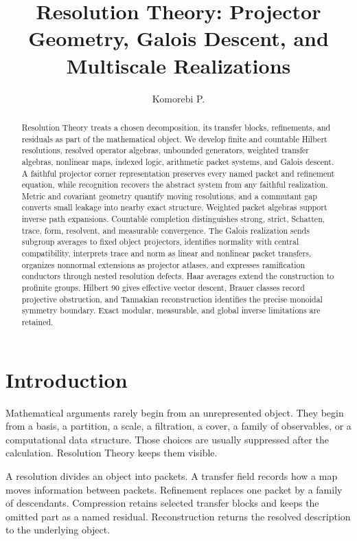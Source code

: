 \documentclass{aomart}
\title[Resolution Theory]{Resolution Theory: Projector Geometry, Galois Descent, and Multiscale Realizations}
\author[Komorebi P.]{Komorebi P.}
\theoremstyle{definition}
\theoremstyle{remark}
\begin{document}
\begin{abstract}
Resolution Theory treats a chosen decomposition, its transfer blocks, refinements, and residuals as part of the mathematical object. We develop finite and countable Hilbert resolutions, resolved operator algebras, unbounded generators, weighted transfer algebras, nonlinear maps, indexed logic, arithmetic packet systems, and Galois descent. A faithful projector corner representation preserves every named packet and refinement equation, while recognition recovers the abstract system from any faithful realization. Metric and covariant geometry quantify moving resolutions, and a commutant gap converts small leakage into nearby exact structure. Weighted packet algebras support inverse path expansions. Countable completion distinguishes strong, strict, Schatten, trace, form, resolvent, and measurable convergence. The Galois realization sends subgroup averages to fixed object projectors, identifies normality with central compatibility, interprets trace and norm as linear and nonlinear packet transfers, organizes nonnormal extensions as projector atlases, and expresses ramification conductors through nested resolution defects. Haar averages extend the construction to profinite groups. Hilbert 90 gives effective vector descent, Brauer classes record projective obstruction, and Tannakian reconstruction identifies the precise monoidal symmetry boundary. Exact modular, measurable, and global inverse limitations are retained.
\end{abstract}
\maketitle
\thispagestyle{plain}

\section{Introduction}\label{sec:introduction}

Mathematical arguments rarely begin from an unrepresented object. They begin from a basis, a partition, a scale, a filtration, a cover, a family of observables, or a computational data structure. Those choices are usually suppressed after the calculation. Resolution Theory keeps them visible.

A resolution divides an object into packets. A transfer field records how a map moves information between packets. Refinement replaces one packet by a family of descendants. Compression retains selected transfer blocks and keeps the omitted part as a named residual. Reconstruction returns the resolved description to the underlying object.
\end{document}
